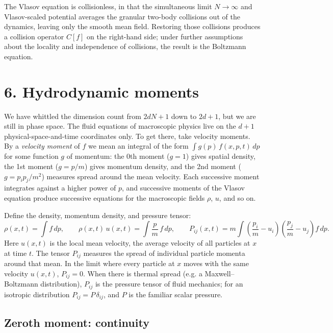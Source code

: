 \documentclass{article}
\begin{document}
The Vlasov equation is collisionless, in that the simultaneous limit \(N \to \infty\) and Vlasov-scaled potential averages the granular two-body collisions out of the dynamics, leaving only the smooth mean field. Restoring those collisions produces a collision operator \(C[f]\) on the right-hand side; under further assumptions about the locality and independence of collisions, the result is the Boltzmann equation.

\section*{6. Hydrodynamic moments}

We have whittled the dimension count from \(2dN+1\) down to \(2d+1\), but we are still in phase space. The fluid equations of macroscopic physics live on the \(d+1\) physical-space-and-time coordinates only. To get there, take velocity moments. By a \emph{velocity moment} of \(f\) we mean an integral of the form \(\int g(p)\, f(x, p, t)\, dp\) for some function \(g\) of momentum: the 0th moment (\(g = 1\)) gives spatial density, the 1st moment (\(g = p/m\)) gives momentum density, and the 2nd moment (\(g = p_i p_j / m^2\)) measures spread around the mean velocity. Each successive moment integrates against a higher power of \(p\), and successive moments of the Vlasov equation produce successive equations for the macroscopic fields \(\rho\), \(u\), and so on.

Define the density, momentum density, and pressure tensor:
\begin{equation}
\rho(x,t) = \int f\, dp,
\qquad
\rho(x,t)\, u(x,t) = \int \frac{p}{m}\, f\, dp,
\qquad
P_{ij}(x,t) = m \int \left(\frac{p_i}{m} - u_i\right)\!\left(\frac{p_j}{m} - u_j\right) f\, dp.
\label{eq:moments}
\end{equation}
Here \(u(x,t)\) is the local mean velocity, the average velocity of all particles at \(x\) at time \(t\). The tensor \(P_{ij}\) measures the spread of individual particle momenta around that mean. In the limit where every particle at \(x\) moves with the same velocity \(u(x,t)\), \(P_{ij} = 0\). When there is thermal spread (e.g. a Maxwell--Boltzmann distribution), \(P_{ij}\) is the pressure tensor of fluid mechanics; for an isotropic distribution \(P_{ij} = P\,\delta_{ij}\), and \(P\) is the familiar scalar pressure.

\subsection*{Zeroth moment: continuity}
\end{document}
